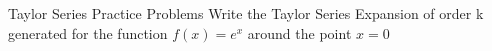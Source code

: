 \documentclass[aspectratio=169]{beamer}
\begin{document}
\begin{frame}{Taylor Series Practice Problems}\label{main1}
	\vspace{-4cm}
Write the Taylor Series Expansion of order k generated for the function \( f(x) = e^{x} \) around the point \( x = 0 \)
\end{frame}
\end{document}
